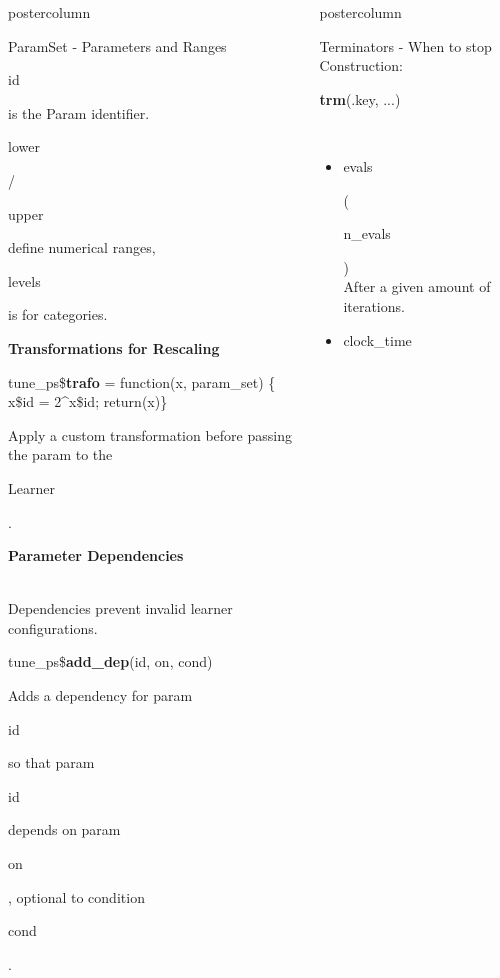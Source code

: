 \documentclass{beamer}
\newlength{\columnheight} %
\newcommand{\codeinline}[1]{\begin{codeboxinline}#1\end{codeboxinline}}
\newcommand{\sectionheading}[1]{{\color{mlrblue}\large\raggedright\textbf{#1}}\vspace{1em}}
\begin{document}
\begin{frame}[fragile]{}
\begin{columns}
\begin{column}{.245\textwidth}
\begin{beamercolorbox}[center]{postercolumn}
\begin{minipage}{.98\textwidth}
{\begin{myblock}{ParamSet - Parameters and Ranges}
\begin{codeboxmultiline}[width=20.75cm]
							\end{codeboxmultiline}
							\codeinline{id} is the Param identifier.
							\codeinline{lower}/\codeinline{upper} define numerical ranges, \codeinline{levels} is for categories.
							\vspace{1em}
							\\
							\sectionheading{Transformations for Rescaling}
							\begin{codeboxmultiline}[width=25.5cm]
								tune\_ps\$\textbf{trafo} = function(x, param\_set) \{\\
								\hspace*{1ex}x\$id =  2\^{}x\$id; return(x)\}
							\end{codeboxmultiline}
							Apply a custom transformation before passing the param to the \codeinline{Learner}.
							\vspace{1em}
							\\
							\sectionheading{Parameter Dependencies}
							\\
							Dependencies prevent invalid learner configurations.
							\\
							\begin{codebox}
								tune\_ps\$\textbf{add\_dep}(id, on, cond)
							\end{codebox}
							Adds a dependency for param \codeinline{id} so that param \codeinline{id} depends on param \codeinline{on}, optional to condition \codeinline{cond}.
						\end{myblock}
						\vfill}
				\end{minipage}
			\end{beamercolorbox}
		\end{column}
		\begin{column}{.245\textwidth}
			\begin{beamercolorbox}[center]{postercolumn}
				\begin{minipage}{.98\textwidth}
					\parbox[t][\columnheight]{\textwidth}{
						\begin{myblock}{Terminators - When to stop}
							Construction: \codeinline{\textbf{trm}(.key, ...)}
							\\
							\begin{itemize}
								\item \codeinline{evals}
								      (\codeinline{n\_evals})\\
								      After a given amount of iterations.
								\item \codeinline{clock\_time}

\end{itemize}
\end{myblock}}
\end{minipage}
\end{beamercolorbox}
\end{column}
\end{columns}
\end{frame}
\end{document}
